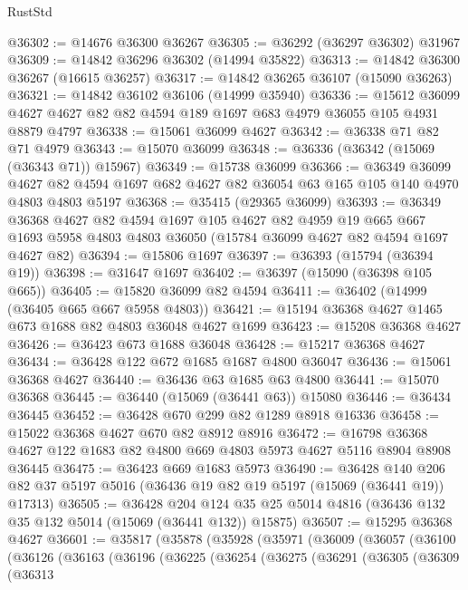 \begin{lexlean}{RustStd}
\begin{coremodule}
@36302 := @14676 @36300 @36267
@36305 := @36292 (@36297 @36302) @31967
@36309 := @14842 @36296 @36302 (@14994 @35822)
@36313 := @14842 @36300 @36267 (@16615 @36257)
@36317 := @14842 @36265 @36107 (@15090 @36263)
@36321 := @14842 @36102 @36106 (@14999 @35940)
@36336 := @15612
    @36099
    @4627
    @4627
    @82
    @82
    @4594
    @189
    @1697
    @683
    @4979
    @36055
    @105
    @4931
    @8879
    @4797
@36338 := @15061 @36099 @4627
@36342 := @36338 @71 @82 @71 @4979
@36343 := @15070 @36099
@36348 := @36336 (@36342 (@15069 (@36343 @71)) @15967)
@36349 := @15738 @36099
@36366 := @36349
    @36099
    @4627
    @82
    @4594
    @1697
    @682
    @4627
    @82
    @36054
    @63
    @165
    @105
    @140
    @4970
    @4803
    @4803
    @5197
@36368 := @35415 (@29365 @36099)
@36393 := @36349
    @36368
    @4627
    @82
    @4594
    @1697
    @105
    @4627
    @82
    @4959
    @19
    @665
    @667
    @1693
    @5958
    @4803
    @4803
    @36050
    (@15784 @36099 @4627 @82 @4594 @1697 @4627 @82)
@36394 := @15806 @1697
@36397 := @36393 (@15794 (@36394 @19))
@36398 := @31647 @1697
@36402 := @36397 (@15090 (@36398 @105 @665))
@36405 := @15820 @36099 @82 @4594
@36411 := @36402 (@14999 (@36405 @665 @667 @5958 @4803))
@36421 := @15194 @36368 @4627 @1465 @673 @1688 @82 @4803 @36048 @4627 @1699
@36423 := @15208 @36368 @4627
@36426 := @36423 @673 @1688 @36048
@36428 := @15217 @36368 @4627
@36434 := @36428 @122 @672 @1685 @1687 @4800 @36047
@36436 := @15061 @36368 @4627
@36440 := @36436 @63 @1685 @63 @4800
@36441 := @15070 @36368
@36445 := @36440 (@15069 (@36441 @63)) @15080
@36446 := @36434 @36445
@36452 := @36428 @670 @299 @82 @1289 @8918 @16336
@36458 := @15022 @36368 @4627 @670 @82 @8912 @8916
@36472 := @16798 @36368 @4627 @122 @1683 @82 @4800 @669 @4803 @5973 @4627 @5116 @8904 @8908 @36445
@36475 := @36423 @669 @1683 @5973
@36490 := @36428
    @140
    @206
    @82
    @37
    @5197
    @5016
    (@36436 @19 @82 @19 @5197 (@15069 (@36441 @19)) @17313)
@36505 := @36428
    @204
    @124
    @35
    @25
    @5014
    @4816
    (@36436 @132 @35 @132 @5014 (@15069 (@36441 @132)) @15875)
@36507 := @15295 @36368 @4627
@36601 := @35817
    (@35878
      (@35928
        (@35971
          (@36009
            (@36057
              (@36100
                (@36126
                  (@36163
                    (@36196
                      (@36225
                        (@36254
                          (@36275
                            (@36291
                              (@36305
                                (@36309
                                  (@36313

\end{coremodule}
\end{lexlean}
